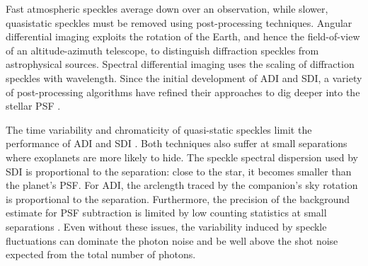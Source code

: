 \documentclass[../main.tex]{subfiles}
\begin{document}
Fast atmospheric speckles average down over an observation, while slower, quasistatic speckles must be removed using post-processing techniques. Angular differential imaging \parencite[ADI,][]{Marois+Lafreniere+Doyon+etal_2006} exploits the rotation of the Earth, and hence the field-of-view of an altitude-azimuth telescope, to distinguish diffraction speckles from astrophysical sources. Spectral differential imaging \parencite[SDI,][]{Racine+Walker+Nadeau+etal_1999,Marois+Doyon+Racine+etal_2000,Sparks+Ford_2002} uses the scaling of diffraction speckles with wavelength. Since the initial development of ADI and SDI, a variety of post-processing algorithms have refined their approaches to dig deeper into the stellar PSF \parencite[e.g.][]{Lafreniere+Marois+Doyon+etal_2007,Soummer+Pueyo+Larkin_2012,Marois+Correia+Galicher+etal_2014}.

The time variability and chromaticity of quasi-static speckles limit the performance of ADI and SDI \parencite{Gerard+Marois+Currie+etal_2019}. Both techniques also suffer at small separations where exoplanets are more likely to hide. The speckle spectral dispersion used by SDI is proportional to the separation: close to the star, it becomes smaller than the planet's PSF. For ADI, the arclength traced by the companion's sky rotation is proportional to the separation. Furthermore, the precision of the background estimate for PSF subtraction is limited by low counting statistics at small separations \parencite{Mawet_2014}. Even without these issues, the variability induced by speckle fluctuations can dominate the photon noise and be well above the shot noise expected from the total number of photons. 
\end{document}

